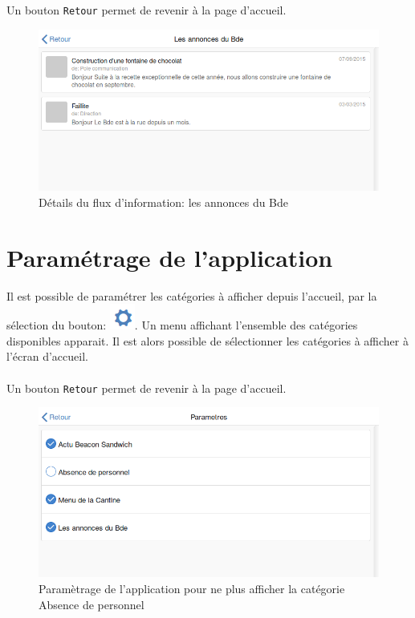 \documentclass{report}
\begin{document}
Un bouton \texttt{Retour} permet de revenir à la page d'accueil.

\begin{figure}[h]
	\centering
	\includegraphics[scale=0.28]{details.png}
	\caption{Détails du flux d'information: \og les annonces du Bde \fg}
\end{figure}

\section{Paramétrage de l'application}


Il est possible de paramétrer les catégories à afficher depuis l'accueil, par la sélection du bouton: \includegraphics[scale=0.4]{boutonParam.png}. Un menu affichant l'ensemble des catégories disponibles apparait. Il est alors possible de sélectionner les catégories à afficher à l'écran d'accueil.

\paragraph{}
Un bouton \texttt{Retour} permet de revenir à la page d'accueil.


\begin{figure}[h]
	\centering
	\includegraphics[scale=0.28]{parametres.png}
	\caption{Paramètrage de l'application pour ne plus afficher la catégorie \og Absence de personnel \fg}
\end{figure}
\end{document}
